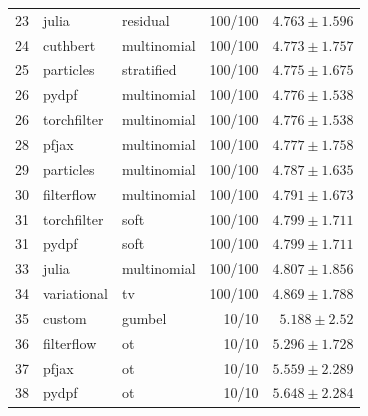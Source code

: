 \begin{table}[!htbp]
\begin{tabular}{rllrr}
23 & julia & residual & 100/100 & $4.763 \pm 1.596$ \\
24 & cuthbert & multinomial & 100/100 & $4.773 \pm 1.757$ \\
25 & particles & stratified & 100/100 & $4.775 \pm 1.675$ \\
26 & pydpf & multinomial & 100/100 & $4.776 \pm 1.538$ \\
26 & torchfilter & multinomial & 100/100 & $4.776 \pm 1.538$ \\
28 & pfjax & multinomial & 100/100 & $4.777 \pm 1.758$ \\
29 & particles & multinomial & 100/100 & $4.787 \pm 1.635$ \\
30 & filterflow & multinomial & 100/100 & $4.791 \pm 1.673$ \\
31 & torchfilter & soft & 100/100 & $4.799 \pm 1.711$ \\
31 & pydpf & soft & 100/100 & $4.799 \pm 1.711$ \\
33 & julia & multinomial & 100/100 & $4.807 \pm 1.856$ \\
34 & variational & tv & 100/100 & $4.869 \pm 1.788$ \\
35 & custom & gumbel & 10/10 & $5.188 \pm 2.52$ \\
36 & filterflow & ot & 10/10 & $5.296 \pm 1.728$ \\
37 & pfjax & ot & 10/10 & $5.559 \pm 2.289$ \\
38 & pydpf & ot & 10/10 & $5.648 \pm 2.284$ \\
\bottomrule
\end{tabular}
\end{table}

